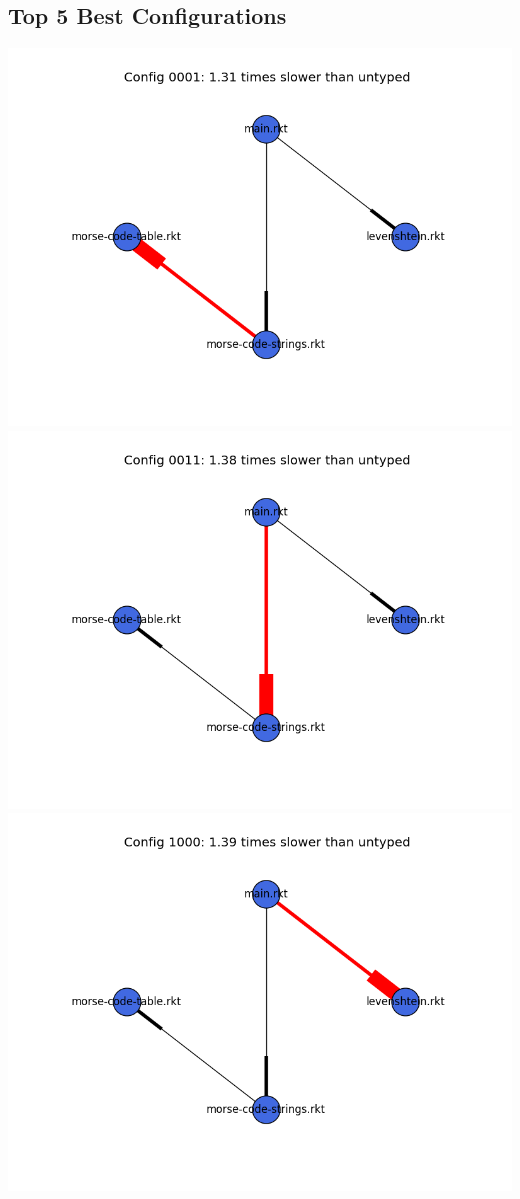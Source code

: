 \documentclass{article}
\begin{document}
\begin{itemize}
\subsection{Top 5 Best Configurations}
\includegraphics[width=\textwidth]{morse-code-module-graph-0001.png}
\includegraphics[width=\textwidth]{morse-code-module-graph-0011.png}
\includegraphics[width=\textwidth]{morse-code-module-graph-1000.png}

\end{itemize}
\end{document}
